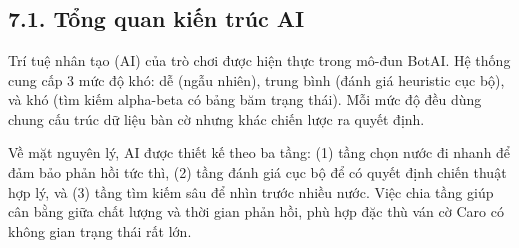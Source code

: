 \newpage
\chapter*{}
\setlength{\parindent}{1.5em}

\section*{7.1. Tổng quan kiến trúc AI}

\setlength{\parindent}{1.5em} Trí tuệ nhân tạo (AI) của trò chơi được hiện thực trong mô-đun BotAI. Hệ thống cung cấp 3 mức độ khó: dễ (ngẫu nhiên), trung bình (đánh giá heuristic cục bộ), và khó (tìm kiếm alpha-beta có bảng băm trạng thái). Mỗi mức độ đều dùng chung cấu trúc dữ liệu bàn cờ nhưng khác chiến lược ra quyết định.

\setlength{\parindent}{1.5em} Về mặt nguyên lý, AI được thiết kế theo ba tầng: (1) tầng chọn nước đi nhanh để đảm bảo phản hồi tức thì, (2) tầng đánh giá cục bộ để có quyết định chiến thuật hợp lý, và (3) tầng tìm kiếm sâu để nhìn trước nhiều nước. Việc chia tầng giúp cân bằng giữa chất lượng và thời gian phản hồi, phù hợp đặc thù ván cờ Caro có không gian trạng thái rất lớn.

